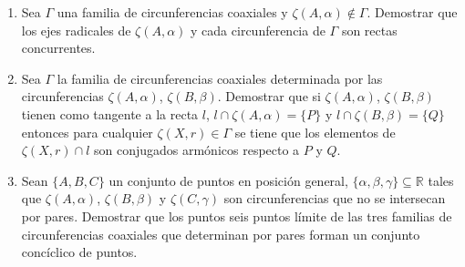 \documentclass[12pt]{report}
\numberwithin{section}{chapter}
\newcommand{\R}{\mathbb R}
\begin{document}
\begin{enumerate}
\item Sea $\Gamma$ una familia de circunferencias coaxiales y $\zeta(A, \alpha) \notin \Gamma$. Demostrar que los ejes radicales de $\zeta (A, \alpha)$ y cada circunferencia de $\Gamma$ son rectas concurrentes.

\item Sea $\Gamma$ la familia de circunferencias coaxiales determinada por las circunferencias $\zeta(A, \alpha)$, $\zeta(B, \beta)$. Demostrar que si $\zeta(A, \alpha)$, $\zeta(B, \beta)$ tienen como tangente a la recta $l$, $l \cap \zeta(A, \alpha) = \{P\}$ y $l \cap \zeta(B, \beta) = \{Q\}$ entonces para cualquier $\zeta(X,r) \in \Gamma$ se tiene que los elementos de $\zeta(X,r) \cap l$ son conjugados armónicos respecto a $P$ y $Q$.

\item Sean $\{A,B,C\}$ un conjunto de puntos en posición general, $\{\alpha, \beta, \gamma\}\subseteq \R$ tales que $\zeta(A, \alpha)$, $\zeta(B, \beta)$ y $\zeta(C, \gamma)$ son circunferencias que no se intersecan por pares. Demostrar que los puntos seis puntos límite de las tres familias de circunferencias coaxiales que determinan por pares forman un conjunto concíclico de puntos.

\end{enumerate}
\end{document}

